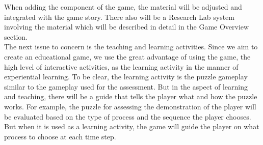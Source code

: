 \documentclass[12pt,oneside,openright,a4paper]{cpe-english-project}
\begin{document}
\begin{itemize}
%

	When adding the component of the game, the material will be adjusted and integrated with the game story. There also will be a Research Lab system involving the material which will be described in detail in the Game Overview section. \\
	The next issue to concern is the teaching and learning activities. Since we aim to create an educational game, we use the great advantage of using the game, the high level of interactive activities, as the learning activity in the manner of experiential learning. To be clear, the learning activity is the puzzle gameplay similar to the gameplay used for the assessment. But in the aspect of learning and teaching, there will be a guide that tells the player what and how the puzzle works. For example, the puzzle for assessing the demonstration of the player will be evaluated based on the type of process and the sequence the player chooses. But when it is used as a learning activity, the game will guide the player on what process to choose at each time step.

\end{itemize}

\end{document}
